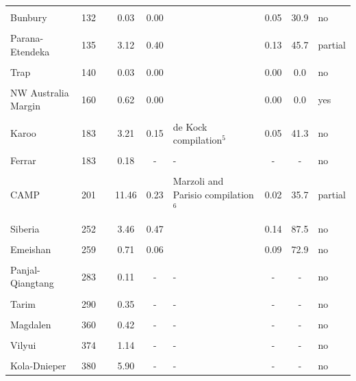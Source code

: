 \documentclass[11pt,letterpaper]{article}
\begin{document}
\begin{table}[h!]
{\begin{tabular}{lc>{\raggedright}p{4cm}cc>{\raggedright}p{4cm}ccl}
 & & & & & & & & \\
Bunbury & 132 & \cite{Zhu2009a} & 0.03 & 0.00 & \cite{Thorne2014a} & 0.05 & 30.9 & no \\
 & & & & & & & & \\
Parana-Etendeka & 135 & \cite{Florisbal2014a, Almeida2018a} & 3.12 & 0.40 & \cite{Coffin2006a} & 0.13 & 45.7 & partial \\
 & & & & & & & & \\
Trap & 140 & \cite{Ernst2001a} & 0.03 & 0.00 & \cite{Ernst2001a} & 0.00 & 0.0 & no \\
 & & & & & & & & \\
NW Australia Margin & 160 & \cite{Pirajno2012a} & 0.62 & 0.00 & \cite{Coffin2006a} & 0.00 & 0.0 & yes \\
 & & & & & & & & \\
Karoo & 183 & \cite{Burgess2015a} & 3.21 & 0.15 & de Kock compilation$^{5}$ & 0.05 & 41.3 & no \\
 & & & & & & & & \\
Ferrar & 183 & \cite{Burgess2015a} & 0.18 & - & - & - & - & no \\
 & & & & & & & & \\
CAMP & 201 & \cite{Blackburn2013a} & 11.46 & 0.23 & Marzoli and Parisio compilation$^{6}$ & 0.02 & 35.7 & partial \\
 & & & & & & & & \\
Siberia & 252 & \cite{Burgess2015b} & 3.46 & 0.47 & \cite{Coffin2006a} & 0.14 & 87.5 & no \\
 & & & & & & & & \\
Emeishan & 259 & \cite{Zhou2002a} & 0.71 & 0.06 & \cite{Coffin2006a} & 0.09 & 72.9 & no \\
 & & & & & & & & \\
Panjal-Qiangtang & 283 & \cite{Zhai2013a} & 0.11 & - & - & - & - & no \\
 & & & & & & & & \\
Tarim & 290 & \cite{Xu2014a} & 0.35 & - & - & - & - & no \\
 & & & & & & & & \\
Magdalen & 360 & \cite{Murphy1999a} & 0.42 & - & - & - & - & no \\
 & & & & & & & & \\
Vilyui & 374 & \cite{Ricci2013a} & 1.14 & - & - & - & - & no \\
 & & & & & & & & \\
Kola-Dnieper & 380 & \cite{Arzamastsev2014a} & 5.90 & - & - & - & - & no \\

\end{tabular}}
\end{table}
\end{document}
